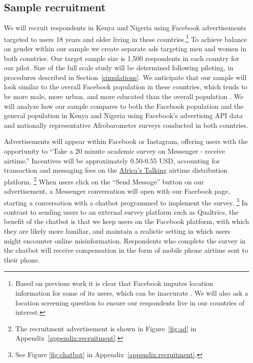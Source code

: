 \documentclass[letterpaper, 12pt, parskip=full,]{scrartcl}
\begin{document}
\subsection{Sample recruitment}
We will recruit respondents in Kenya and Nigeria using Facebook advertisements targeted to users 18 years and older living in these countries.\footnote{Based on previous work it is clear that Facebook imputes location information for some of its users, which can be inaccurate \citep{Rosenzweig_2020}. We will also ask a location screening question to ensure our respondents live in our countries of interest.} %
To achieve balance on gender within our sample we create separate ads targeting men and women in both countries. Our target sample size is 1,500 respondents in each country for our pilot. Size of the full scale study will be determined following piloting, in procedures described in Section~\ref{simulations}. We anticipate that our sample will look similar to the overall Facebook population in these countries, which tends to be more male, more urban, and more educated than the overall population \citep{Rosenzweig_2020}. We will analyze how our sample compares to both the Facebook population and the general population in Kenya and Nigeria using Facebook's advertising API data and nationally representative Afrobarometer surveys conducted in both countries. 


Advertisements will appear within Facebook or Instagram, offering users with the opportunity to ``Take a 20 minute academic survey on Messenger - receive airtime.'' Incentives will be approximately 0.50-0.55 USD, accounting for transaction and messaging fees on the \href{https://africastalking.com/}{Africa's Talking} airtime distribution platform.%
\footnote{The recruitment advertisement is shown in Figure~\ref{fig:ad} in Appendix~\ref{appendix:recruitment}.} %
 When users click on the ``Send Message'' button on our advertisement, a Messenger conversation will open with our Facebook page, starting a conversation with a chatbot programmed to implement the survey.%
 \footnote{See Figure \ref{fig:chatbot} in Appendix~\ref{appendix:recruitment}.} %
 In contrast to sending users to an external survey platform such as Qualtrics, the benefit of the chatbot is that we keep users on the Facebook platform, with which they are likely more familiar, and maintain a realistic setting in which users might encounter online misinformation.  Respondents who complete the survey in the chatbot will receive compensation in the form of mobile phone airtime sent to their phone. %
\end{document}

